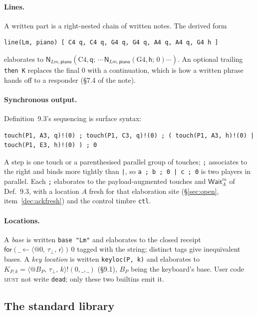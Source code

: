 \documentclass[11pt,a4paper]{article}
\makeatletter
\theoremstyle{definition}
\theoremstyle{remark}
\newcommand{\nm}[3]{\langle @#1,\,#2,\,#3\rangle}
\newcommand{\rest}{\mathsf{r}}
\newcommand{\MUST}{\textsc{must}}
\newcommand{\wild}{\_}
\makeatother
\begin{document}
\paragraph{Lines.} A written part is a right-nested chain of written notes. The
derived form
\begin{lstlisting}[language=score]
line(Lm, piano) [ C4 q, C4 q, G4 q, G4 q, A4 q, A4 q, G4 h ]
\end{lstlisting}
elaborates to $\mathsf N_{Lm,\mathsf{piano}}(\mathrm{C4},\mathsf q;\,\cdots\,
\mathsf N_{Lm,\mathsf{piano}}(\mathrm{G4},\mathsf h;\,0)\cdots)$. An optional
trailing \texttt{then K} replaces the final $0$ with a continuation, which is
how a written phrase hands off to a responder (\S7.4 of the note).

\paragraph{Synchronous output.} Definition~9.3's sequencing is surface
syntax:
\begin{lstlisting}[language=score]
touch(P1, A3, q)!(0) ; touch(P1, C3, q)!(0) ; ( touch(P1, A3, h)!(0) | touch(P1, E3, h)!(0) ) ; 0
\end{lstlisting}
A step is one touch or a parenthesised parallel group of touches; \texttt{;}
associates to the right and binds more tightly than \texttt{|}, so
\texttt{a ; b ; 0 | c ; 0} is two players in parallel. Each \texttt{;} elaborates to the payload-augmented
touches and $\mathsf{Wait}^m_A$ of Def.~9.3, with a location $A$ fresh for that
elaboration site (\S\ref{sec:open}, item~\ref{dec:ackfresh}) and the control timbre
\texttt{ctl}.

\paragraph{Locations.} A \emph{base} is written \texttt{base "Lm"} and
elaborates to the closed receipt
$\mathsf{for}(\_\leftarrow\nm{0}{\tau_\bot}{\rest})\,0$ tagged with the string;
distinct tags give inequivalent bases. A \emph{key location} is written
\texttt{keyloc(P, k)} and elaborates to
$K_{P,k} = \nm{B_P}{\tau_\bot}{k}!(0,\wild,\wild)$ (\S9.1), $B_P$ being the
keyboard's base. User code \MUST{} not write \texttt{dead}; only these two
builtins emit it.

\subsection{The standard library}
\end{document}
